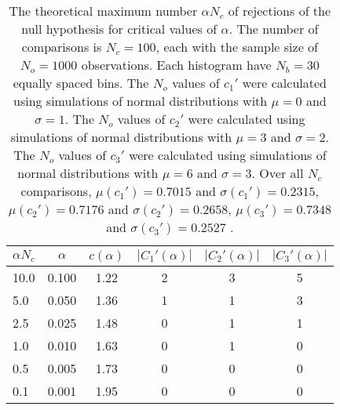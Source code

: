 \begin{table}[h!]
\begin{center}
\begin{tabular}{| l | c | c | c | c | c |}\hline
$\alpha N_c$ & $\alpha$ & $c(\alpha)$ & $|C_1'(\alpha)|$ & $|C_2'(\alpha)|$ & $|C_3'(\alpha)|$ \\\hline
10.0 & 0.100 & 1.22 & 2 & 3 & 5 \\\hline
5.0 & 0.050 & 1.36 & 1 & 1 & 3 \\\hline
2.5 & 0.025 & 1.48 & 0 & 1 & 1 \\\hline
1.0 & 0.010 & 1.63 & 0 & 1 & 0 \\\hline
0.5 & 0.005 & 1.73 & 0 & 0 & 0 \\\hline
0.1 & 0.001 & 1.95 & 0 & 0 & 0 \\\hline
\end{tabular}
\caption{The theoretical maximum number $\alpha N_c$ of rejections
of the null hypothesis for critical values of $\alpha$.
The number of comparisons is $N_c=100$,
each with the sample size of $N_o=1000$ observations.
Each histogram have $N_b=30$ equally spaced bins.
The $N_o$ values of $c_1'$ were calculated using simulations of
 normal distributions with $\mu=0$ and $\sigma=1$.
The $N_o$ values of $c_2'$ were calculated using simulations of
 normal distributions with $\mu=3$ and $\sigma=2$.
The $N_o$ values of $c_3'$ were calculated using simulations of
 normal distributions with $\mu=6$ and $\sigma=3$.
Over all $N_c$ comparisons,
 $\mu(c_1')=0.7015$ and $\sigma(c_1')=0.2315$,
 $\mu(c_2')=0.7176$ and $\sigma(c_2')=0.2658$,
 $\mu(c_3')=0.7348$ and $\sigma(c_3')=0.2527$ .
}
\end{center}
\end{table}